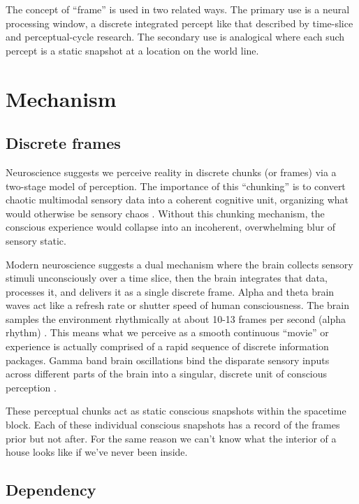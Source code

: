 \documentclass[11pt,a4paper]{article}
\begin{document}
The concept of “frame” is used in two related ways. The primary use is a neural processing window, a discrete integrated percept like that described by time-slice and perceptual-cycle research. The secondary use is analogical where each such percept is a static snapshot at a location on the world line.

\section{Mechanism}

\subsection{Discrete frames}

Neuroscience suggests we perceive reality in discrete chunks (or frames) via a two-stage model of perception. The importance of this ``chunking'' is to convert chaotic multimodal sensory data into a coherent cognitive unit, organizing what would otherwise be sensory chaos \citep{herzog2016}. Without this chunking mechanism, the conscious experience would collapse into an incoherent, overwhelming blur of sensory static.

Modern neuroscience suggests a dual mechanism where the brain collects sensory stimuli unconsciously over a time slice, then the brain integrates that data, processes it, and delivers it as a single discrete frame. Alpha and theta brain waves act like a refresh rate or shutter speed of human consciousness. The brain samples the environment rhythmically at about 10-13 frames per second (alpha rhythm) \citep{vanrullen2016}. This means what we perceive as a smooth continuous ``movie'' or experience is actually comprised of a rapid sequence of discrete information packages. Gamma band brain oscillations bind the disparate sensory inputs across different parts of the brain into a singular, discrete unit of conscious perception \citep{doesburg2009}.

These perceptual chunks act as static conscious snapshots within the spacetime block. Each of these individual conscious snapshots has a record of the frames prior but not after. For the same reason we can’t know what the interior of a house looks like if we’ve never been inside.

\subsection{Dependency}
\end{document}
